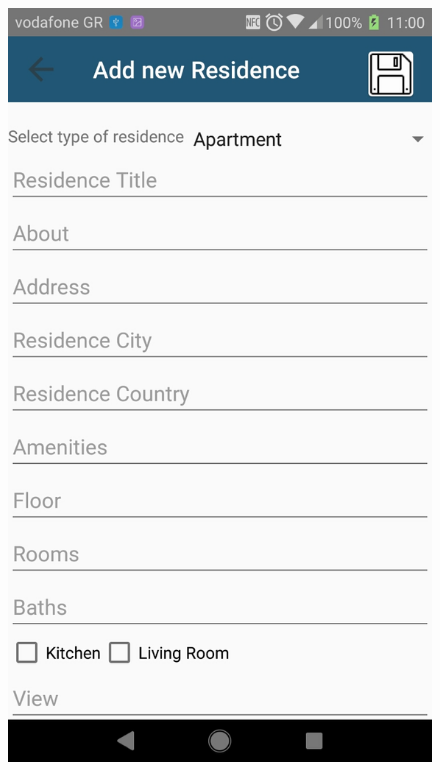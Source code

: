 \documentclass[12pt]{article}
\begin{document}
	\begin{figure} [H]
		\begin{center}
			\includegraphics [scale = 0.18] {25-addResidence.jpg}

\end{center}
\end{figure}
\end{document}
